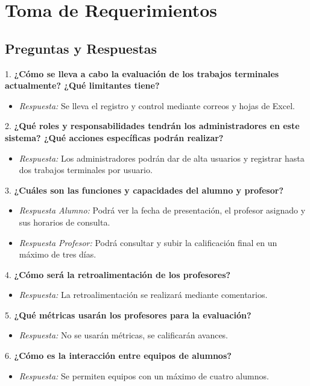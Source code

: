 \section{Toma de Requerimientos}

\subsection{Preguntas y Respuestas}

1. \textbf{¿Cómo se lleva a cabo la evaluación de los trabajos terminales actualmente? ¿Qué limitantes tiene?}
   \begin{itemize}
       \item \textit{Respuesta:} Se lleva el registro y control mediante correos y hojas de Excel.
   \end{itemize}

2. \textbf{¿Qué roles y responsabilidades tendrán los administradores en este sistema? ¿Qué acciones específicas podrán realizar?}
   \begin{itemize}
       \item \textit{Respuesta:} Los administradores podrán dar de alta usuarios y registrar hasta dos trabajos terminales por usuario.
   \end{itemize}

3. \textbf{¿Cuáles son las funciones y capacidades del alumno y profesor?}
   \begin{itemize}
       \item \textit{Respuesta Alumno:} Podrá ver la fecha de presentación, el profesor asignado y sus horarios de consulta.
       \item \textit{Respuesta Profesor:} Podrá consultar y subir la calificación final en un máximo de tres días.
   \end{itemize}

4. \textbf{¿Cómo será la retroalimentación de los profesores?}
   \begin{itemize}
       \item \textit{Respuesta:} La retroalimentación se realizará mediante comentarios.
   \end{itemize}

5. \textbf{¿Qué métricas usarán los profesores para la evaluación?}
   \begin{itemize}
       \item \textit{Respuesta:} No se usarán métricas, se calificarán avances.
   \end{itemize}

6. \textbf{¿Cómo es la interacción entre equipos de alumnos?}
   \begin{itemize}
       \item \textit{Respuesta:} Se permiten equipos con un máximo de cuatro alumnos.
   \end{itemize}

